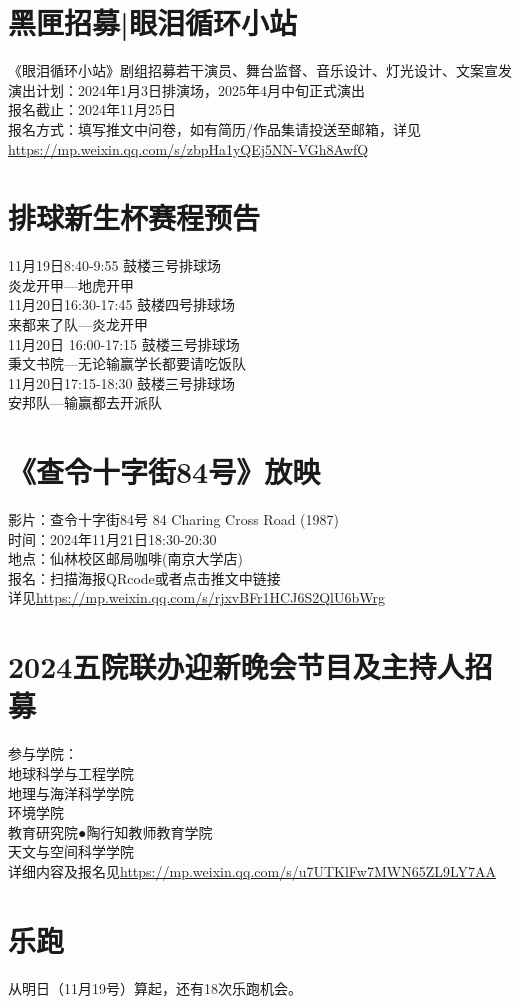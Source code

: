 \documentclass[letterpaper, 12pt]{article}
\begin{document}
\begin{multicols}{2}
\section{黑匣招募|眼泪循环小站}
《眼泪循环小站》剧组招募若干演员、舞台监督、音乐设计、灯光设计、文案宣发\\
演出计划：2024年1月3日排演场，2025年4月中旬正式演出\\
报名截止：2024年11月25日\\
报名方式：填写推文中问卷，如有简历/作品集请投送至邮箱，详见\url{https://mp.weixin.qq.com/s/zbpHa1yQEj5NN-VGh8AwfQ}

\section{排球新生杯赛程预告}
11月19日8:40-9:55 鼓楼三号排球场\\
炎龙开甲—地虎开甲\\
11月20日16:30-17:45 鼓楼四号排球场\\
来都来了队—炎龙开甲\\
11月20日 16:00-17:15	鼓楼三号排球场\\
秉文书院—无论输赢学长都要请吃饭队\\
11月20日17:15-18:30	鼓楼三号排球场\\
安邦队—输赢都去开派队\\

\section{《查令十字街84号》放映}
影片：查令十字街84号 84 Charing Cross Road (1987)\\
时间：2024年11月21日18:30-20:30\\
地点：仙林校区邮局咖啡(南京大学店)\\
报名：扫描海报QRcode或者点击推文中链接\\
详见\url{https://mp.weixin.qq.com/s/rjxvBFr1HCJ6S2QlU6bWrg}

\section{2024五院联办迎新晚会节目及主持人招募}
参与学院：\\
地球科学与工程学院\\
地理与海洋科学学院\\
环境学院\\
教育研究院●陶行知教师教育学院\\
天文与空间科学学院\\
详细内容及报名见\url{https://mp.weixin.qq.com/s/u7UTKlFw7MWN65ZL9LY7AA}
\section{乐跑}
从明日（11月19号）算起，还有18次乐跑机会。
\end{multicols} 
\end{document}
